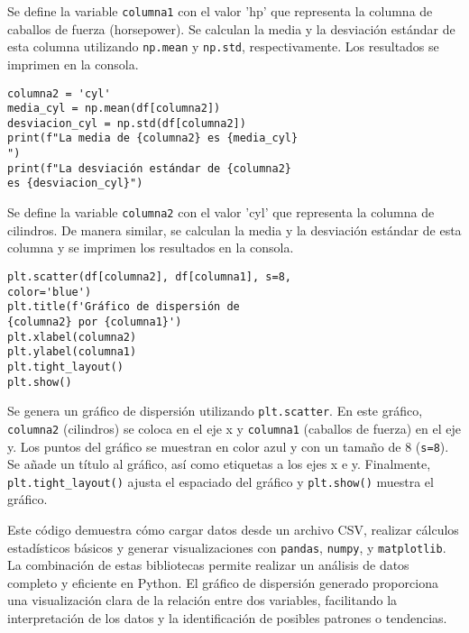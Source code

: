 \documentclass[conference]{IEEEtran}
\begin{document}
Se define la variable \texttt{columna1} con el valor 'hp' que representa la columna de caballos de fuerza (horsepower). Se calculan la media y la desviación estándar de esta columna utilizando \texttt{np.mean} y \texttt{np.std}, respectivamente. Los resultados se imprimen en la consola.

\begin{verbatim}
columna2 = 'cyl'
media_cyl = np.mean(df[columna2])
desviacion_cyl = np.std(df[columna2])
print(f"La media de {columna2} es {media_cyl}
")
print(f"La desviación estándar de {columna2}
es {desviacion_cyl}")
\end{verbatim}

Se define la variable \texttt{columna2} con el valor 'cyl' que representa la columna de cilindros. De manera similar, se calculan la media y la desviación estándar de esta columna y se imprimen los resultados en la consola.

\begin{verbatim}
plt.scatter(df[columna2], df[columna1], s=8,
color='blue')
plt.title(f'Gráfico de dispersión de 
{columna2} por {columna1}')
plt.xlabel(columna2)
plt.ylabel(columna1)
plt.tight_layout()
plt.show()
\end{verbatim}

Se genera un gráfico de dispersión utilizando \texttt{plt.scatter}. En este gráfico, \texttt{columna2} (cilindros) se coloca en el eje x y \texttt{columna1} (caballos de fuerza) en el eje y. Los puntos del gráfico se muestran en color azul y con un tamaño de 8 (\texttt{s=8}). Se añade un título al gráfico, así como etiquetas a los ejes x e y. Finalmente, \texttt{plt.tight\_layout()} ajusta el espaciado del gráfico y \texttt{plt.show()} muestra el gráfico.

Este código demuestra cómo cargar datos desde un archivo CSV, realizar cálculos estadísticos básicos y generar visualizaciones con \texttt{pandas}, \texttt{numpy}, y \texttt{matplotlib}. La combinación de estas bibliotecas permite realizar un análisis de datos completo y eficiente en Python. El gráfico de dispersión generado proporciona una visualización clara de la relación entre dos variables, facilitando la interpretación de los datos y la identificación de posibles patrones o tendencias.




\vspace{0.2cm}
\end{document}
